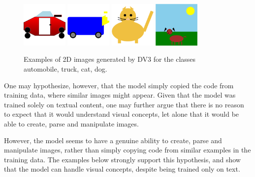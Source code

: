 \begin{figure}[ht]
	\centering
	\includegraphics[width=0.2\textwidth]{Section 2/automobile_2d.png}
	\hspace{0.2in}
	\includegraphics[width=0.2\textwidth]{Section 2/truck_2d.png}
	\hspace{0.2in}
	\includegraphics[width=0.2\textwidth]{Section 2/cat_2d.png}
	\hspace{0.2in}
	\includegraphics[width=0.2\textwidth]{Section 2/dog_2d.png}
	\caption{Examples of 2D images generated by DV3 for the classes automobile, truck, cat, dog.}
	\label{fig:2d}
\end{figure}

One may hypothesize, however, that the model simply copied the code from training data, where similar images might appear. Given that the model was trained solely on textual content, one may further argue that there is no reason to expect that it would understand visual concepts, let alone that it would be able to create, parse and manipulate images. 

However, the model seems to have a genuine ability to create, parse and manipulate images, rather than simply copying code from similar examples in the training data. The examples below strongly support this hypothesis, and show that the model can handle visual concepts, despite being trained only on text.

